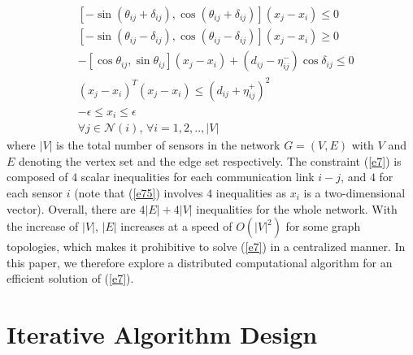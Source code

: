 \documentclass[journal]{IEEEtran}
\begin{document}
\begin{subequations}\label{e7}
\begin{align}
&[-\sin(\theta_{ij}+\delta_{ij}),\cos(\theta_{ij}+\delta_{ij})](x_j-x_i)\leq 0\label{e71}\\
&[-\sin(\theta_{ij}-\delta_{ij}),\cos(\theta_{ij}-\delta_{ij})](x_j-x_i)\geq 0\label{e72}\\
&-[\cos\theta_{ij}, \sin\theta_{ij}](x_j-x_i)+(d_{ij}-\eta^-_{ij})\cos\delta_{ij}\leq 0\label{e73}\\
&(x_j-x_i)^T(x_j-x_i) \leq (d_{ij}+\eta^+_{ij})^2\label{e74}\\
&-\epsilon\leq x_i\leq \epsilon\label{e75}\\
&\forall j\in\mathcal{N}(i),\,\forall i=1,2,..,|V|\nonumber
\end{align}
\end{subequations}
where $|V|$ is the total number of sensors in the network $G=(V, E)$ with $V$ and $E$ denoting the vertex set and the edge set respectively. The constraint (\ref{e7}) is composed of $4$ scalar inequalities for each communication link $i-j$, and $4$ for each sensor $i$ (note that (\ref{e75}) involves $4$ inequalities as $x_i$ is a two-dimensional vector). Overall, there are $4|E|+4|V|$ inequalities for the whole network. With the increase of $|V|$, $|E|$ increases at a speed of $O(|V|^2)$ for some graph topologies, which makes it prohibitive to solve (\ref{e7}) in a centralized manner. In this paper, we therefore explore a distributed computational algorithm for an efficient solution of (\ref{e7}).

\section{Iterative Algorithm Design}
\end{document}

